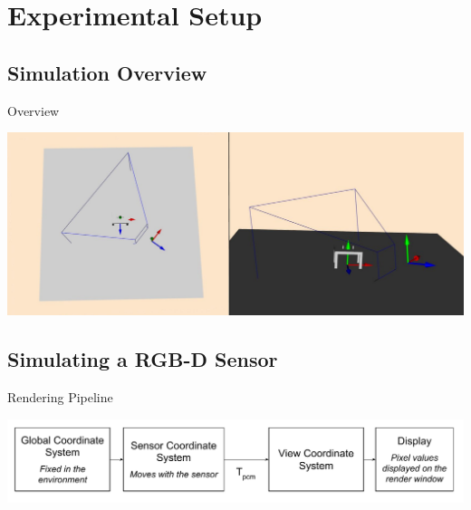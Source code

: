 \section{Experimental Setup}

\subsection{Simulation Overview}

\begin{frame}{Overview} %
  \begin{center}
  \includegraphics[width=\textwidth]
    {../figures/expsetup_simulation_overview.pdf}
  \end{center}
\end{frame}

\note[itemize]{
\item
}

\subsection{Simulating a RGB-D Sensor}

\begin{frame}{Rendering Pipeline} %
  \begin{center}
  \includegraphics[width=\textwidth]
    {../figures/expsetup_render_pipeline.pdf}
  \end{center}
\end{frame}


